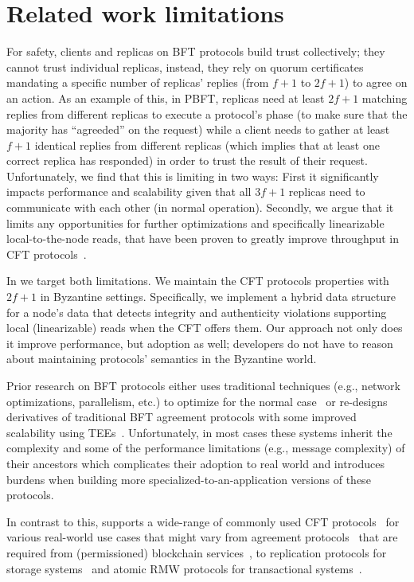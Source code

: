 \section{Related work limitations}
 For safety, clients and replicas on BFT protocols build trust collectively; they cannot trust individual replicas, instead, they rely on quorum certificates mandating a specific number of replicas' replies (from $f+1$ to $2f+1$) to agree on an action. As an example of this, in PBFT, replicas need at least $2f+1$ matching replies from different replicas to execute a protocol's phase (to make sure that the majority has ``agreeded'' on the request) while a client needs to gather at least $f+1$ identical replies from different replicas (which implies that at least one correct replica has responded) in order to trust the result of their request. Unfortunately, we find that this is limiting in two ways: First it significantly impacts performance and scalability given that all $3f+1$ replicas need to communicate with each other (in normal operation). Secondly, we argue that it limits any opportunities for further optimizations and specifically linearizable local-to-the-node reads, that have been proven to greatly improve throughput in CFT protocols~\cite{}.
 
In \projecttitle{} we target both limitations. We maintain the CFT protocols properties with $2f+1$ in Byzantine settings. Specifically, we implement a hybrid data structure for a node's data that detects integrity and authenticity violations supporting  local (linearizable) reads when the CFT offers them. Our approach not only does it improve performance, but adoption as well; developers do not have to reason about maintaining protocols' semantics in the Byzantine world.


 Prior research on BFT protocols either uses traditional techniques (e.g., network optimizations, parallelism, etc.) to optimize for the normal case~\cite{} or re-designs derivatives of traditional BFT agreement protocols with some improved scalability using TEEs~\cite{}.  Unfortunately, in most cases these systems inherit the complexity and some of the performance limitations (e.g., message complexity) of their ancestors which complicates their adoption to real world and introduces burdens when building more specialized-to-an-application versions of these protocols. 

In contrast to this, \projecttitle{} supports a wide-range of commonly used CFT protocols~\cite{} for various real-world use cases that might vary from agreement protocols~\cite{} that are required from (permissioned) blockchain services~\cite{}, to replication protocols for storage systems~\cite{} and atomic RMW protocols for transactional systems~\cite{}. 



